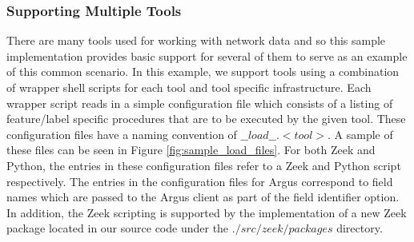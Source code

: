 \documentclass[sigconf, anonymous, screen]{acmart}
\begin{document}
\subsubsection{Supporting Multiple Tools}\label{subsubsec:tool_support}
There are many tools used for working with network data and so this sample implementation provides basic support for several of them to serve as an example of this common scenario.
In this example, we support tools using a combination of wrapper shell scripts for each tool and tool specific infrastructure.
Each wrapper script reads in a simple configuration file which consists of a listing of feature/label specific procedures that are to be executed by the given tool.
These configuration files have a naming convention of $\_\_load\_\_.<tool>$.
A sample of these files can be seen in Figure \ref{fig:sample_load_files}.
For both Zeek and Python, the entries in these configuration files refer to a Zeek and Python script respectively.
The entries in the configuration files for Argus correspond to field names which are passed to the Argus client as part of the field identifier option.
In addition, the Zeek scripting is supported by the implementation of a new Zeek package located in our source code under the $./src/zeek/packages$ directory.
\end{document}
